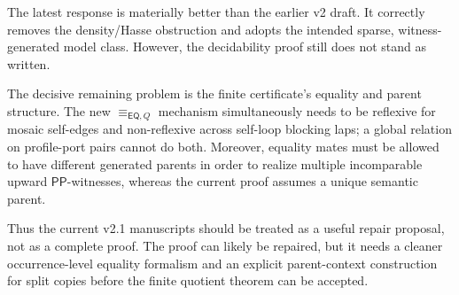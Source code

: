 \documentclass[11pt]{article}
\newcommand{\PP}{\mathsf{PP}}
\newcommand{\EQ}{\mathsf{EQ}}
\newcommand{\eqQ}{\equiv_{\EQ,Q}}
\begin{document}
The latest response is materially better than the earlier v2 draft.  It
correctly removes the density/Hasse obstruction and adopts the intended sparse,
witness-generated model class.  However, the decidability proof still does not
stand as written.

The decisive remaining problem is the finite certificate's equality and parent
structure.  The new \(\eqQ\) mechanism simultaneously needs to be reflexive for
mosaic self-edges and non-reflexive across self-loop blocking laps; a global
relation on profile-port pairs cannot do both.  Moreover, equality mates must be
allowed to have different generated parents in order to realize multiple
incomparable upward \(\PP\)-witnesses, whereas the current proof assumes a
unique semantic parent.

Thus the current v2.1 manuscripts should be treated as a useful repair proposal,
not as a complete proof.  The proof can likely be repaired, but it needs a
cleaner occurrence-level equality formalism and an explicit parent-context
construction for split copies before the finite quotient theorem can be
accepted.
\end{document}
